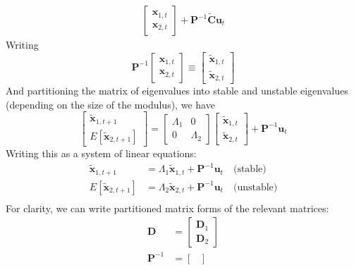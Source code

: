 \documentclass[12pt]{article}
\begin{document}
\begin{itemize}
\[\begin{split}
\begin{bmatrix}
        \textbf{x}_{1,t}\\
        \textbf{x}_{2,t}
        \end{bmatrix} + \textbf{P}^{-1}\boldsymbol{\widetilde{C}}\textbf{u}_t
    \end{split}\]
    Writing
    \[\textbf{P}^{-1}\begin{bmatrix}
    \textbf{x}_{1,t}\\
    \textbf{x}_{2,t}
    \end{bmatrix} \equiv 
    \begin{bmatrix}
    \boldsymbol{\widetilde{x}}_{1,t}\\
    \boldsymbol{\widetilde{x}}_{2,t}
    \end{bmatrix}\]
    And partitioning the matrix of eigenvalues into stable and unstable eigenvalues (depending on the size of the modulus), we have
    \[\begin{bmatrix}
        \boldsymbol{\widetilde{x}}_{1,t+1}\\
        E[\boldsymbol{\widetilde{x}}_{2,t+1}]
        \end{bmatrix} = \begin{bmatrix}
        \Lambda_1 & 0 \\
        0 & \Lambda_2
        \end{bmatrix}\begin{bmatrix}
        \boldsymbol{\widetilde{x}}_{1,t}\\
        \boldsymbol{\widetilde{x}}_{2,t}
        \end{bmatrix} + \textbf{P}^{-1}\textbf{u}_t\]
    Writing this as a system of linear equations:
    \[\begin{split}
        \boldsymbol{\widetilde{x}}_{1,t+1} &= \Lambda_1\boldsymbol{\widetilde{x}}_{1,t} + \textbf{P}^{-1}\textbf{u}_t \quad \text{(stable)}\\
        E[\boldsymbol{\widetilde{x}}_{2,t+1}] &= \Lambda_2\boldsymbol{\widetilde{x}}_{2,t} + \textbf{P}^{-1}\textbf{u}_t  \quad \text{(unstable)}\\
    \end{split}\]
    For clarity, we can write partitioned matrix forms of the relevant matrices:
    \[\begin{split}
        \textbf{D} &= \begin{bmatrix}
        \textbf{D}_1 \\
        \textbf{D}_2
        \end{bmatrix} \\ 
        \textbf{P}^{-1} &= \begin{bmatrix}

\end{bmatrix}
\end{split}\]
\end{itemize}
\end{document}
